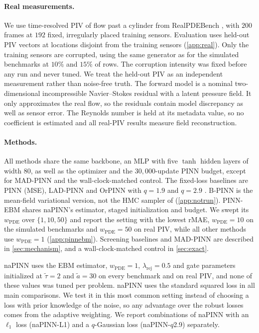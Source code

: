 \documentclass[twoside]{article}
\newcommand{\rej}{\lambda_{\mathrm{rej}}}
\newcommand{\wpde}{w_{\mathrm{PDE}}}
\begin{document}
\paragraph{Real measurements.}
We use time-resolved PIV of flow past a cylinder from RealPDEBench
\citep{hu2026realpdebench}, with $200$ frames at $192$ fixed, irregularly placed
training sensors. Evaluation uses held-out PIV vectors at locations disjoint
from the training sensors (\cref{app:real}). Only the training sensors are
corrupted, using the same generator as for the simulated benchmarks at $10\%$
and $15\%$ of rows. The corruption
intensity was fixed before any run and never tuned. We treat the held-out PIV
as an independent measurement rather than noise-free truth. The forward model
is a nominal two-dimensional incompressible Navier--Stokes residual with a
latent pressure field. It only approximates the real flow, so the residuals
contain model discrepancy as well as sensor error. The Reynolds number is held
at its metadata value, so no coefficient is estimated and all real-PIV results
measure field reconstruction.

\paragraph{Methods.}
All methods share the same backbone, an MLP with five $\tanh$ hidden layers of
width $80$, as well as the optimizer and the $30{,}000$-update PINN budget,
except for MAD-PINN and the wall-clock-matched control. The
fixed-loss baselines are PINN (MSE), LAD-PINN \citep{Peng2022} and OrPINN with
$q = 1.9$ and $q = 2.9$ \citep{Duarte2025}. B-PINN is the mean-field variational
version, not the HMC sampler of \citet{Yang2021} (\cref{app:notrun}). PINN-EBM
\citep{Pilar2024} shares naPINN's estimator, staged initialization and budget.
We swept its $\wpde$ over $\{1, 10, 50\}$ and report the setting with the
lowest rMAE, $\wpde = 10$ on the simulated benchmarks and $\wpde = 50$ on real
PIV, while all other methods use $\wpde = 1$ (\cref{app:pinnebm}).
Screening baselines and MAD-PINN are described in \cref{sec:mechanism}, and a
wall-clock-matched control in \cref{sec:exact}.

naPINN uses the EBM estimator,
$\wpde = 1$, $\rej = 0.5$ and gate parameters initialized at $\tilde\tau = 2$
and $\tilde a = 30$ on every benchmark and on real PIV, and none of these values was tuned per problem.
naPINN uses the standard squared loss in all main comparisons. We test it in this
most common setting instead of choosing a loss with prior knowledge of the
noise, so any advantage over the robust losses comes from the adaptive
weighting. We report combinations of naPINN with an $\ell_1$ loss
(naPINN-L1) and a $q$-Gaussian loss (naPINN-$q$2.9) separately.
\end{document}
